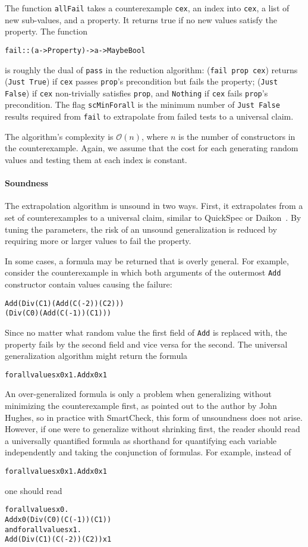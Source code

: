 \documentclass{sigplanconf}
\newenvironment{code}{\begin{alltt}}{\end{alltt}}
\newcommand{\ttp}[1]{\texttt{#1}}
\begin{document}
The function \ttp{allFail} takes a counterexample \ttp{cex}, an index into
\ttp{cex}, a list of new sub-values, and a property.  It returns true if no new
values satisfy the property.  The function
%
\begin{code}
fail :: (a -> Property) -> a -> Maybe Bool
\end{code}
%
\noindent
is roughly the dual of \ttp{pass} in the reduction algorithm: (\ttp{fail
  prop cex}) returns (\ttp{Just True}) if \ttp{cex} passes \ttp{prop}'s
precondition but fails the property; (\ttp{Just False}) if \ttp{cex}
non-trivially satisfies \ttp{prop}, and \ttp{Nothing} if \ttp{cex} fails
\ttp{prop}'s precondition.  The flag \ttp{scMinForall} is the minimum number
of \ttp{Just False} results required from \ttp{fail} to extrapolate from failed
tests to a universal claim.

The algorithm's complexity is $\mathcal{O}(n)$, where $n$ is the number of
constructors in the counterexample.  Again, we assume that the cost for each
generating random values and testing them at each index is constant.

\paragraph{Soundness}
The extrapolation algorithm is unsound in two ways.  First, it extrapolates from
a set of counterexamples to a universal claim, similar to QuickSpec or
Daikon~\cite{qs,daikon}.  By tuning the parameters, the risk of an unsound
generalization is reduced by requiring more or larger values to fail the
property.

In some cases, a formula may be returned that is overly general.  For example,
consider the counterexample in which both arguments of the outermost \ttp{Add}
constructor contain values causing the failure:
%
\begin{code}
Add (Div (C 1) (Add (C (-2)) (C 2)))
    (Div (C 0) (Add (C (-1)) (C 1)))
\end{code}
%
\noindent
Since no matter what random value the first field of \ttp{Add} is replaced with,
the property fails by the second field and vice versa for the second.  The
universal generalization algorithm might return the formula
\noindent
%
\begin{code}
forall values x0 x1 . Add x0 x1
\end{code}
%
\noindent
An over-generalized formula is only a problem when generalizing without
minimizing the counterexample first, as pointed out to the author by John
Hughes, so in practice with SmartCheck, this form of unsoundness does not arise.
However, if one were to generalize without shrinking first, the reader should
read a universally quantified formula as shorthand for quantifying each variable
independently and taking the conjunction of formulas.  For example, instead of
%
\begin{code}
forall values x0 x1 . Add x0 x1
\end{code}
%
\noindent
one should read
%
%
\begin{code}
      forall values x0 .
        Add x0 (Div (C 0) (C (-1)) (C 1))
  and forall values x1 .
        Add (Div (C 1) (C (-2)) (C 2)) x1
\end{code}
\end{document}
